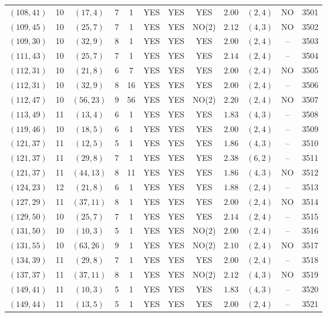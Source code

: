 \begin{longtable}{|c|c|c|c|c|c|c|c|c|c|c|c|}
$(108,41)$ & 10 & $(17,4)$ & 7 & 1 & YES & YES & YES & $2.00$ & $(2,4)$ & NO & 3501\\
$(109,45)$ & 10 & $(25,7)$ & 7 & 1 & YES & YES & NO(2) & $2.12$ & $(4,3)$ & NO & 3502\\
$(109,30)$ & 10 & $(32,9)$ & 8 & 1 & YES & YES & YES & $2.00$ & $(2,4)$ & -- & 3503\\
$(111,43)$ & 10 & $(25,7)$ & 7 & 1 & YES & YES & YES & $2.14$ & $(2,4)$ & -- & 3504\\
$(112,31)$ & 10 & $(21,8)$ & 6 & 7 & YES & YES & YES & $2.00$ & $(2,4)$ & NO & 3505\\
$(112,31)$ & 10 & $(32,9)$ & 8 & 16 & YES & YES & YES & $2.00$ & $(2,4)$ & -- & 3506\\
$(112,47)$ & 10 & $(56,23)$ & 9 & 56 & YES & YES & NO(2) & $2.20$ & $(2,4)$ & NO & 3507\\
$(113,49)$ & 11 & $(13,4)$ & 6 & 1 & YES & YES & YES & $1.83$ & $(4,3)$ & -- & 3508\\
$(119,46)$ & 10 & $(18,5)$ & 6 & 1 & YES & YES & YES & $2.00$ & $(2,4)$ & -- & 3509\\
$(121,37)$ & 11 & $(12,5)$ & 5 & 1 & YES & YES & YES & $1.86$ & $(4,3)$ & -- & 3510\\
$(121,37)$ & 11 & $(29,8)$ & 7 & 1 & YES & YES & YES & $2.38$ & $(6,2)$ & -- & 3511\\
$(121,37)$ & 11 & $(44,13)$ & 8 & 11 & YES & YES & YES & $1.86$ & $(4,3)$ & NO & 3512\\
$(124,23)$ & 12 & $(21,8)$ & 6 & 1 & YES & YES & YES & $1.88$ & $(2,4)$ & -- & 3513\\
$(127,29)$ & 11 & $(37,11)$ & 8 & 1 & YES & YES & YES & $2.00$ & $(2,4)$ & NO & 3514\\
$(129,50)$ & 10 & $(25,7)$ & 7 & 1 & YES & YES & YES & $2.14$ & $(2,4)$ & -- & 3515\\
$(131,50)$ & 10 & $(10,3)$ & 5 & 1 & YES & YES & NO(2) & $2.00$ & $(2,4)$ & -- & 3516\\
$(131,55)$ & 10 & $(63,26)$ & 9 & 1 & YES & YES & NO(2) & $2.10$ & $(2,4)$ & NO & 3517\\
$(134,39)$ & 11 & $(29,8)$ & 7 & 1 & YES & YES & YES & $2.00$ & $(2,4)$ & -- & 3518\\
$(137,37)$ & 11 & $(37,11)$ & 8 & 1 & YES & YES & NO(2) & $2.12$ & $(4,3)$ & NO & 3519\\
$(149,41)$ & 11 & $(10,3)$ & 5 & 1 & YES & YES & YES & $1.83$ & $(4,3)$ & -- & 3520\\
$(149,44)$ & 11 & $(13,5)$ & 5 & 1 & YES & YES & YES & $2.00$ & $(2,4)$ & -- & 3521\\

\end{longtable}
